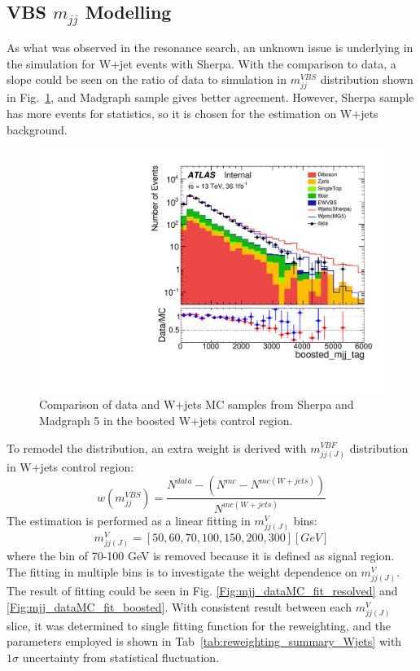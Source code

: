 \subsection{VBS $m_{jj}$ Modelling}
As what was observed in the resonance search, an unknown issue is underlying in the simulation for W+jet events with Sherpa. With the comparison to data, a slope could be seen on the ratio of data to simulation in $m_{jj}^{VBS}$ distribution shown in Fig.~\ref{Fig:mtagmis}, and Madgraph sample gives better agreement. However, Sherpa sample has more events for statistics, so it is chosen for the estimation on W+jets background. 
\begin{figure}
	\begin{center}
		\includegraphics[width=0.6\linewidth]{Chapter5/boosted_mjj_tag.pdf}
	\end{center}
	\caption[]{
		Comparison of data and W+jets MC samples from Sherpa and Madgraph 5 in the boosted W+jets control region.
	}    
	\label{Fig:mtagmis}
\end{figure}
\noindent
To remodel the distribution, an extra weight is derived with $m_{jj(J)}^{VBF}$ distribution in W+jets control region:
\begin{equation}
w(m^{VBS}_{jj}) = \frac{N^{data}-(N^{mc}-N^{mc( W+jets)})}{N^{mc( W+jets)}} 
\end{equation}  
The estimation is performed as a linear fitting in $m_{jj(J)}^{V}$ bins:
\begin{equation}
m_{jj(J)}^{V} = [50,60,70,100,150,200,300] [GeV]
\end{equation}  
where the bin of 70-100 GeV is removed because it is defined as signal region. The fitting in multiple bins is to investigate the weight dependence on  $m_{jj(J)}^{V}$. The result of fitting could be seen in Fig. \ref{Fig:mjj_dataMC_fit_resolved} and \ref{Fig:mjj_dataMC_fit_boosted}. With consistent result between each $m_{jj(J)}^{V}$ slice, it was determined to single fitting function for the reweighting, and the parameters employed is shown in Tab~\ref{tab:reweighting_summary_Wjets} with $1\sigma$ uncertainty from statistical fluctuation. 
